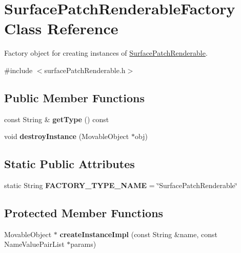 \hypertarget{classSurfacePatchRenderableFactory}{
\section{\-Surface\-Patch\-Renderable\-Factory \-Class \-Reference}
\label{d7/d3e/classSurfacePatchRenderableFactory}
}


\-Factory object for creating instances of \hyperlink{classSurfacePatchRenderable}{\-Surface\-Patch\-Renderable}.  




{\ttfamily \#include $<$surface\-Patch\-Renderable.\-h$>$}

\subsection*{\-Public \-Member \-Functions}
\begin{DoxyCompactItemize}
\item 
\hypertarget{classSurfacePatchRenderableFactory_a7c7b40b8d720611b412712ffe3dfc2ef}{
const \-String \& {\bfseries get\-Type} () const }
\label{d7/d3e/classSurfacePatchRenderableFactory_a7c7b40b8d720611b412712ffe3dfc2ef}

\item 
\hypertarget{classSurfacePatchRenderableFactory_aba5850b8618e0a38bdbfa77f69498f67}{
void {\bfseries destroy\-Instance} (\-Movable\-Object $\ast$obj)}
\label{d7/d3e/classSurfacePatchRenderableFactory_aba5850b8618e0a38bdbfa77f69498f67}

\end{DoxyCompactItemize}
\subsection*{\-Static \-Public \-Attributes}
\begin{DoxyCompactItemize}
\item 
\hypertarget{classSurfacePatchRenderableFactory_aca21f074d0bbd8da0082e3f2ad81d095}{
static \-String {\bfseries \-F\-A\-C\-T\-O\-R\-Y\-\_\-\-T\-Y\-P\-E\-\_\-\-N\-A\-M\-E} = \char`\"{}\-Surface\-Patch\-Renderable\char`\"{}}
\label{d7/d3e/classSurfacePatchRenderableFactory_aca21f074d0bbd8da0082e3f2ad81d095}

\end{DoxyCompactItemize}
\subsection*{\-Protected \-Member \-Functions}
\begin{DoxyCompactItemize}
\item 
\hypertarget{classSurfacePatchRenderableFactory_a5aeee9a71d2310ad02d76efbc3e1f535}{
\-Movable\-Object $\ast$ {\bfseries create\-Instance\-Impl} (const \-String \&name, const \-Name\-Value\-Pair\-List $\ast$params)}
\label{d7/d3e/classSurfacePatchRenderableFactory_a5aeee9a71d2310ad02d76efbc3e1f535}

\end{DoxyCompactItemize}


